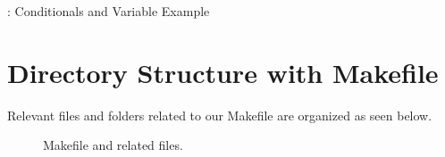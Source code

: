 \begin{mybox}{\thetcbcounter: Conditionals and Variable Example}
	
\end{mybox}

\section{Directory Structure with Makefile}

\justifying
Relevant files and folders related to our Makefile are organized as seen below.

\begin{figure}[!htb]
	
	\caption{Makefile and related files.}
\label{makefile}
\end{figure}

